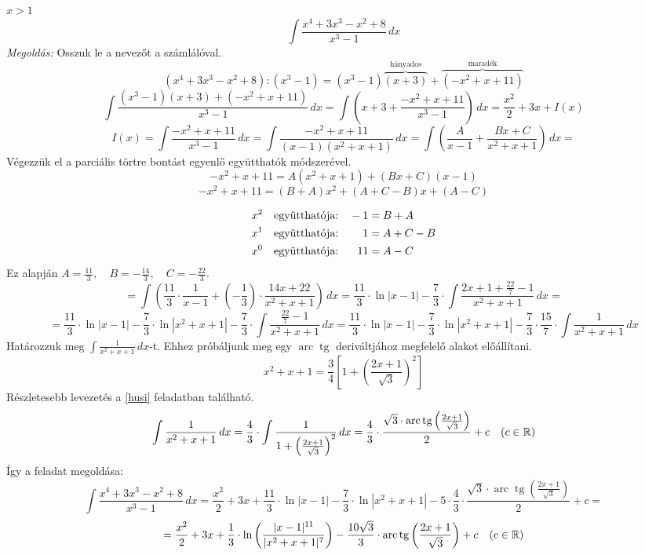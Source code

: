 \documentclass[a4paper,11.5pt]{article}
\DeclareMathOperator{\tg}{tg}
\DeclareMathOperator{\arc}{arc}
\begin{document}
	\begin{exercise}$x>1$
		\[\int\frac{x^4+3x^3-x^2+8}{x^3-1}\,dx  \] 
		\textit{Megoldás:}
		Osszuk le a nevezőt a számlálóval.
		\[ (x^4+3x^3-x^2+8):(x^3-1)=(x^3-1)\overbrace{(x+3)}^{\text{hányados}}+\overbrace{(-x^2+x+11)}^{\text{maradék}} \]
		\[\int\frac{(x^3-1)(x+3)+(-x^2+x+11)}{x^3-1}\,dx=\int\left(x+3+\frac{-x^2+x+11}{x^3-1}\right)\,dx=\frac{x^2}{2}+3x+I(x) \]
		\[ I(x)=\int\frac{-x^2+x+11}{x^3-1}\,dx=\int\frac{-x^2+x+11}{(x-1)(x^2+x+1)}\,dx=\int\left(\frac{A}{x-1}+\frac{Bx+C}{x^2+x+1}\right)\,dx= \]
		Végezzük el a parciális törtre bontást egyenlő együtthatók módszerével.
		\[ -x^2+x+11=A(x^2+x+1)+(Bx+C)(x-1) \]
		\[ -x^2+x+11=(B+A)x^2+(A+C-B)x+(A-C) \]
		
		\vspace{-7mm}
		\begin{align*}
			x^2 \quad \text{együtthatója:}&\quad          -1=B+A\\
			x^1 \quad \text{együtthatója:}&\hspace{7.8mm}  1=A+C-B\\
			x^0 \quad \text{együtthatója:}&\hspace{6.1mm}  11=A-C
		\end{align*}
		Ez alapján $A= \frac{11}{3},\quad B=-\frac{14}{3},\quad C=-\frac{22}{3}.$
		\[=\int\left(\frac{11}{3}\cdot\frac{1}{x-1}+\left(-\frac{1}{3}\right)\cdot\frac{14x+22}{x^2+x+1}\right)\,dx=\frac{11}{3}\cdot\ln|x-1|-\frac{7}{3}\cdot\int\frac{2x+1+\frac{22}{7}-1}{x^2+x+1}\,dx= \]
		\[ =\frac{11}{3}\cdot\ln|x-1|-\frac{7}{3}\cdot\ln|x^2+x+1|-\frac{7}{3}\cdot\int\frac{\frac{22}{7}-1}{x^2+x+1}\,dx=\frac{11}{3}\cdot\ln|x-1|-\frac{7}{3}\cdot\ln|x^2+x+1|-\frac{7}{3}\cdot\frac{15}{7}\cdot\int\frac{1}{x^2+x+1}\,dx \]
		Határozzuk meg $\int\frac{1}{x^2+x+1}\,dx$-t. Ehhez próbáljunk meg egy $\arc\tg$ deriváltjához megfelelő alakot előállítani.
		\[ x^2+x+1=\frac{3}{4}\left[1+\left(\frac{2x+1}{\sqrt{3}}\right)^2\right] \]
		Részletesebb levezetés a \ref{husi} feladatban található.
		\[ \int\frac{1}{x^2+x+1}\,dx=\frac{4}{3}\cdot\int\frac{1}{1+\left(\frac{2x+1}{\sqrt{3}}\right)^2}\,dx=\frac{4}{3}\cdot\frac{\sqrt{3}\cdot\arc\tg\left(\frac{2x+1}{\sqrt{3}}\right)}{2}+c\quad (c\in\R)  \]
		Így a feladat megoldása:
		\[ \int\frac{x^4+3x^3-x^2+8}{x^3-1}\,dx =\frac{x^2}{2}+3x+ \frac{11}{3}\cdot\ln|x-1|-\frac{7}{3}\cdot\ln|x^2+x+1|-5\cdot\frac{4}{3}\cdot\frac{\sqrt{3}\cdot\arc\tg\left(\frac{2x+1}{\sqrt{3}}\right)}{2}+c= \]
		\[=\frac{x^2}{2}+3x+ \frac{1}{3}\cdot\ln\left(\frac{|x-1|^{11}}{|x^2+x+1|^7}\right)-\frac{10\sqrt{3}}{3}\cdot\arc\tg\left(\frac{2x+1}{\sqrt{3}}\right)+c\quad (c\in\R)\]
	\end{exercise}
\end{document}
